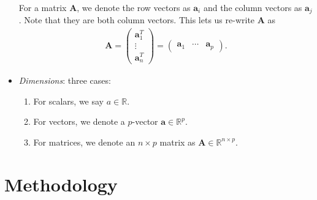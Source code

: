 \documentclass[10pt]{article}
\newcommand{\mydef}[1]{\textcolor{SteelBlue3}{\textit{#1}}} %
\begin{document}
\begin{itemize}
    For a matrix $\mathbf{A}$, we denote the row vectors as $\bm{a}_i$ and the column vectors as $\mathbf{a}_j$. Note that they are both column vectors. This lets us re-write $\mathbf{A}$ as 
    \begin{align*}
        \mathbf{A} = \begin{pmatrix}
            \bm{a}_1^T \\ \vdots \\ \bm{a}_n^T
        \end{pmatrix}
        = 
        \begin{pmatrix}
            \mathbf{a}_1 & \cdots & \mathbf{a}_p
        \end{pmatrix}.
    \end{align*}
    \item \mydef{Dimensions}: three cases:
    \begin{enumerate}
        \item For scalars, we say $a \in \mathbb{R}$.
        \item For vectors, we denote a $p$-vector $\bm{a} \in \mathbb{R}^{p}$.
        \item For matrices, we denote an $n \times p$ matrix as $\mathbf{A} \in \mathbb{R}^{n \times p}$.
    \end{enumerate}
\end{itemize}

\section{Methodology}
\end{document}
